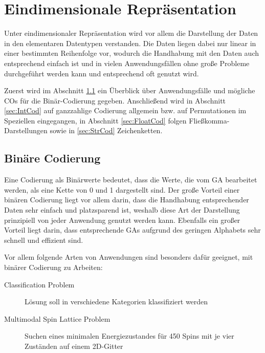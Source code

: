 
\section{Eindimensionale Repräsentation}
\label{sec:EindimRep}

Unter eindimensionaler Repräsentation wird vor allem die Darstellung der Daten in den elementaren Datentypen verstanden. Die Daten liegen dabei nur linear in einer bestimmten Reihenfolge vor, wodurch die Handhabung mit den Daten auch entsprechend einfach ist und in vielen Anwendungsfällen ohne große Probleme durchgeführt werden kann und entsprechend oft genutzt wird.

Zuerst wird im Abschnitt \ref{sec:BinCod} ein Überblick über Anwendungsfälle und mög\-liche COs für die Binär-Codierung gegeben. Anschließend wird in Abschnitt \ref{sec:IntCod} auf ganzzahlige Codierung allgemein bzw. auf Permutationen im Speziellen eingegangen, in Abschnitt \ref{sec:FloatCod} folgen Fließkomma-Darstellungen sowie in \ref{sec:StrCod} Zeichenketten.

\subsection{Binäre Codierung}
\label{sec:BinCod}

	Eine Codierung als Binärwerte bedeutet, dass die Werte, die vom GA bearbeitet werden, als eine Kette von 0 und 1 dargestellt sind. Der große Vorteil einer binären Codierung liegt vor allem darin, dass die Handhabung entsprechender Daten sehr einfach und platzsparend ist, weshalb diese Art der Darstellung prinzipiell von jeder Anwendung genutzt werden kann. Ebenfalls ein großer Vorteil liegt darin, dass entsprechende GAs aufgrund des geringen Alphabets sehr schnell und effizient sind.\cite{TacklingRealCodedGA}
	
	Vor allem folgende Arten von Anwendungen sind besonders dafür geeignet, mit binärer Codierung zu Arbeiten:\cite{Survey}
	\begin{description}
		\item[Classification Problem] Lösung soll in verschiedene Kategorien klassifiziert werden\cite{NearestNeighborClassifier}
		\item[Multimodal Spin Lattice Problem] Suchen eines minimalen Ener\-gie\-zu\-stan\-des für 450 Spins mit je vier Zuständen auf einem 2D-Gitter\cite{SelectionSchemesSpatialIsolation}
	\end{description}
	
